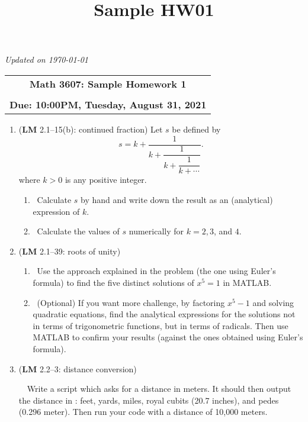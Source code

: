 \documentclass[11pt]{article}
\date{}
\title{Sample HW01}
\newcommand{\icPen}{\textcolor{Mahogany}{\faPencil*~}}
\newcommand{\icCom}{\textcolor{RoyalBlue}{\faLaptopCode~}}
\begin{document}
\textit{\footnotesize Updated on \today}

\hrulefill
\begin{center}
  \begin{tabular}{ c }
    \LARGE \bf Math 3607: Sample Homework 1\\\\
    \large \bf Due: 10:00PM, Tuesday, August 31, 2021
  \end{tabular}
\end{center}
\vspace{5mm}

\begin{enumerate}
\item (\textbf{LM} 2.1--15(b): continued fraction)
\label{sec:org81d377f}
Let $s$ be defined by
\[
s = k + \dfrac{1}{k + \dfrac{1}{k + \dfrac{1}{k + \cdots}}}.
\]
where $k > 0$ is any positive integer.

\begin{enumerate}
\item \icPen Calculate $s$ by hand and write down the result as an (analytical) expression of $k$.
\item \icCom Calculate the values of $s$ numerically for $k = 2, 3$, and $4$.
\end{enumerate}

\item (\textbf{LM} 2.1--39: roots of unity)
\label{sec:orgea4ebba}

\begin{enumerate}
\item \icCom Use the approach explained in the problem (the one using Euler's formula) to find the five distinct solutions of $x^5 = 1$ in MATLAB.

\item \icPen (Optional) If you want more challenge, by factoring $x^5 - 1$ and solving quadratic equations, find the analytical expressions for the solutions not in terms of trigonometric functions, but in terms of radicals. Then use MATLAB to confirm your results (against the ones obtained using Euler's formula).
\end{enumerate}

\item (\textbf{LM} 2.2--3: distance conversion)
\label{sec:org6dc8323}

\icPen \icCom Write a script which asks for a distance in meters. It should then output the distance in : feet, yards, miles, royal cubits (20.7 inches), and pedes (0.296 meter). Then run your code with a distance of 10,000 meters.


\end{enumerate}
\end{document}
